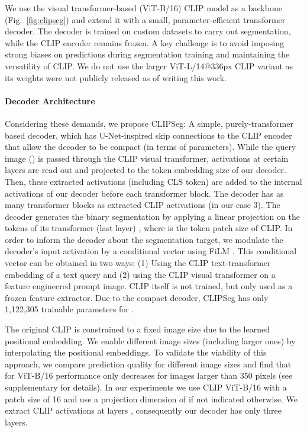 \documentclass[10pt,twocolumn,letterpaper]{article}
\begin{document}
We use the visual transformer-based (ViT-B/16) CLIP \cite{radford20} model as a backbone (Fig.~\ref{fig:clipseg}) and extend it with a small, parameter-efficient transformer decoder. The decoder is trained on custom datasets to carry out segmentation, while the CLIP encoder remains frozen.
A key challenge is to avoid imposing strong biases on predictions during segmentation training and maintaining the versatility of CLIP. We do not use the larger ViT-L/14@336px CLIP variant as its weights were not publicly released as of writing this work.


\def\v{\mathbf{v}}
\def\t{\mathbf{t}}
\def\y{\mathbf{y}}
\def\q{\mathbf{q}}
\def\s{\mathbf{s}}

\paragraph{Decoder Architecture}



Considering these demands, we propose CLIPSeg: A simple, purely-transformer based decoder, which has U-Net-inspired skip connections to the CLIP encoder that allow the decoder to be compact (in terms of parameters). While the query image () is passed through the CLIP visual transformer, activations at certain layers  are read out and projected to the token embedding size  of our decoder. 
Then, these extracted activations (including CLS token) are added to the internal activations of our decoder before each transformer block. The decoder has as many transformer blocks as extracted CLIP activations (in our case 3).
The decoder generates the binary segmentation by applying a linear projection on the tokens of its transformer (last layer) , where  is the token patch size of CLIP.
In order to inform the decoder about the segmentation target, we modulate the decoder's input activation by a conditional vector using FiLM \cite{dumoulin18}. 
This conditional vector can be obtained in two ways: (1) Using the CLIP text-transformer embedding of a text query and (2) using the CLIP visual transformer on a feature engineered prompt image. 
CLIP itself is not trained, but only used as a frozen feature extractor. Due to the compact decoder, CLIPSeg has only 1,122,305 trainable parameters for .

The original CLIP is constrained to a fixed image size due to the learned positional embedding. We enable different image sizes (including larger ones) by interpolating the positional embeddings. To validate the viability of this approach, we compare prediction quality for different image sizes and find that for ViT-B/16 performance only decreases for images larger than 350 pixels (see supplementary for details).
In our experiments we use CLIP ViT-B/16 with a patch size  of 16 and use a projection dimension of  if not indicated otherwise. We extract CLIP activations at layers , consequently our decoder has only three layers.
\end{document}
